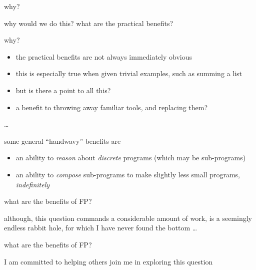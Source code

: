 \begin{frame}
\begin{block}{why?}
\begin{center}
why would we do this? what are the practical benefits?
\end{center}
\end{block}
\end{frame}

\begin{frame}
\begin{block}{why?}
\begin{center}
\begin{itemize}
\item<1-> the practical benefits are not always immediately obvious
\item<2-> this is especially true when given trivial examples, such as summing a list
\item<3-> but is there a point to all this?
\item<4-> a benefit to throwing away familiar tools, and replacing them?
\end{itemize}
\end{center}
\end{block}
\end{frame}

\begin{frame}
\begin{center}
\ldots
\end{center}
\end{frame}

\begin{frame}
\begin{block}{some general ``handwavy'' benefits are}
\begin{center}
\begin{itemize}
\item<1-> an ability to \emph{reason} about \emph{discrete} programs (which may be sub-programs)
\item<2-> an ability to \emph{compose} sub-programs to make slightly less small programs, \emph{indefinitely}
\end{itemize}
\end{center}
\end{block}
\end{frame}

\begin{frame}
\begin{block}{what are the benefits of FP?}
\begin{center}
although, this question commands a considerable amount of work, is a seemingly endless rabbit hole, for which I have never found the bottom \ldots
\end{center}
\end{block}
\end{frame}

\begin{frame}
\begin{block}{what are the benefits of FP?}
\begin{center}
I am committed to helping others join me in exploring this question
\end{center}
\end{block}
\end{frame}
